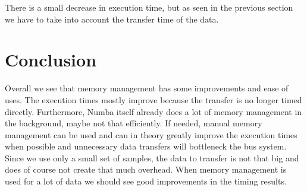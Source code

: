 There is a small decrease in execution time, but as seen in the previous section we have to take into account the transfer time of the data.

\newpage
\section{Conclusion}
\label{sec:conclusion}

Overall we see that memory management has some improvements and ease of uses. The execution times mostly improve because the transfer is no longer timed directly. Furthermore, Numba itself already does a lot of memory management in the background, maybe not that efficiently. If needed, manual memory management can be used and can in theory greatly improve the execution times when possible and unnecessary data transfers will bottleneck the bus system. Since we use only a small set of samples, the data to transfer is not that big and does of course not create that much overhead. When memory management is used for a lot of data we should see good improvements in the timing results.